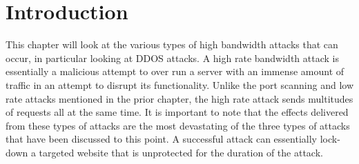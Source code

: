 
\section*{Introduction}
This chapter will look at the various types of high bandwidth attacks that can occur, in particular looking at DDOS attacks. A high rate bandwidth attack is essentially a malicious attempt to over run a server with an immense amount of traffic in an attempt to disrupt its functionality. Unlike the port scanning and low rate attacks mentioned in the prior chapter, the high rate attack sends multitudes of requests all at the same time. It is important to note that the effects delivered from these types of attacks are the most devastating of the three types of attacks that have been discussed to this point. A successful attack can essentially lock-down a targeted website that is unprotected for the duration of the attack. 